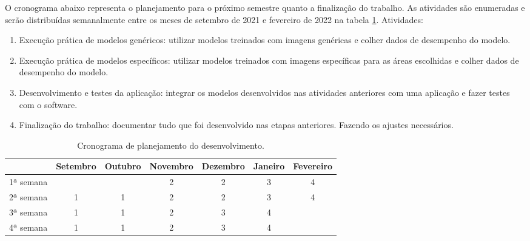 O cronograma abaixo representa o planejamento para o próximo semestre quanto a finalização do trabalho. As atividades são enumeradas e serão distribuídas semanalmente entre os meses de setembro de 2021 e fevereiro de 2022 na tabela \ref{tab:cronograma}. Atividades:

\begin{enumerate}
    \item Execução prática de modelos genéricos: utilizar modelos treinados com imagens genéricas e colher dados de desempenho do modelo.
    
    \item Execução prática de modelos específicos: utilizar modelos treinados com imagens específicas para as
    áreas escolhidas e colher dados de desempenho do modelo.
    
    \item Desenvolvimento e testes da aplicação: integrar os modelos desenvolvidos nas atividades anteriores com uma aplicação e fazer testes com o software.
    
    \item Finalização do trabalho: documentar tudo que foi desenvolvido nas etapas anteriores. Fazendo os ajustes necessários.
\end{enumerate}

\begin{table}[H]
    \centering
    \caption{Cronograma de planejamento do desenvolvimento.}
    \begin{tabular}{|l|c|c|c|c|c|c|} \hline
        & \textbf{Setembro} & \textbf{Outubro} & \textbf{Novembro} & \textbf{Dezembro} & \textbf{Janeiro} & \textbf{Fevereiro} \\ \hline
        1ª semana &   &   & 2 & 2 & 3 & 4 \\ \hline
        2ª semana & 1 & 1 & 2 & 2 & 3 & 4 \\ \hline
        3ª semana & 1 & 1 & 2 & 3 & 4 & \\ \hline
        4ª semana & 1 & 1 & 2 & 3 & 4 & \\ \hline
    \end{tabular}
    \label{tab:cronograma}
\end{table}
